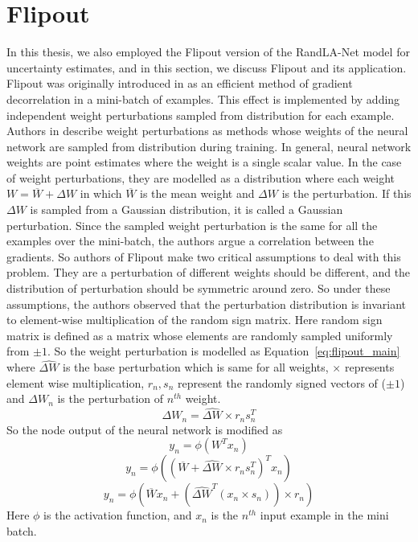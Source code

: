 \section{Flipout}
\label{sec:meth_flipout}
In this thesis, we also employed the Flipout version of the RandLA-Net model for uncertainty estimates, and in this section, we discuss Flipout and its application.
Flipout was originally introduced in \cite{Flipout} as an efficient method of gradient decorrelation in a mini-batch of examples.
This effect is implemented by adding independent weight perturbations sampled from distribution for each example.
Authors in \cite{Flipout} describe weight perturbations as methods whose weights of the neural network are sampled from distribution during training.
In general, neural network weights are point estimates where the weight is a single scalar value. In the case of weight perturbations, they are modelled as a distribution where each weight $W=\overline{W}+\Delta W$ in which $\overline{W}$ is the mean weight and $\Delta W$ is the perturbation.
If this $\Delta W$ is sampled from a Gaussian distribution, it is called a Gaussian perturbation.
Since the sampled weight perturbation is the same for all the examples over the mini-batch, the authors argue a correlation between the gradients.
So authors of Flipout make two critical assumptions to deal with this problem. 
They are a perturbation of different weights should be different, and the distribution of perturbation should be symmetric around zero.
So under these assumptions, the authors observed that the perturbation distribution is invariant to element-wise multiplication of the random sign matrix.
Here random sign matrix is defined as a matrix whose elements are randomly sampled uniformly from $\pm 1$. 
So the weight perturbation is modelled as Equation~\ref{eq:flipout_main} where $\widehat{\Delta W}$ is the base perturbation which is same for all weights, $\times$ represents element wise multiplication, $r_n, s_n$ represent the randomly signed vectors of ($\pm 1$) and $\Delta W_n$ is the perturbation of $n^{th}$ weight.
\begin{equation}
    \Delta W_n = \widehat{\Delta W} \times r_n s_{n}^T
    \label{eq:flipout_main}
\end{equation}
So the node output of the neural network is modified as 
$$y_n = \phi(W^T x_n) $$
$$y_n = \phi((\overline{W}+\widehat{\Delta W} \times r_n s_{n}^T)^Tx_n)$$
$$y_n = \phi(\overline{W} x_n+(\widehat{\Delta W}^T (x_n\times s_{n}))\times r_n)$$
Here $\phi$ is the activation function, and $x_n$ is the $n^{th}$ input example in the mini batch.
